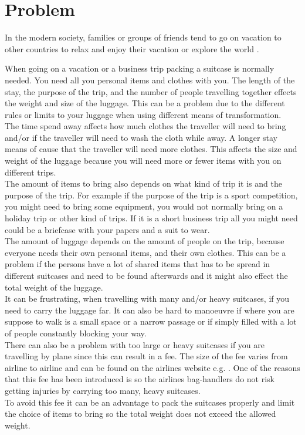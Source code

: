 \section{Problem}
In the modern society, families or groups of friends tend to go on vacation to other countries to relax and enjoy their vacation or explore the world \citep{danskecharter}.

When going on a vacation or a business trip packing a suitcase is normally needed. You need all you personal items and clothes with you. The length of the stay, the purpose of the trip, and the number of people travelling together effects the weight and size of the luggage. This can be a problem due to the different rules or limits to your luggage when using different means of transformation.\\

The time spend away affects how much clothes the traveller will need to bring and/or if the traveller will need to wash the cloth while away. A longer stay means of cause that the traveller will need more clothes. This affects the size and weight of the luggage because you will need more or fewer items with you on different trips.\\
 
The amount of items to bring also depends on what kind of trip it is and the purpose of the trip. For example if the purpose of the trip is a sport competition, you might need to bring some equipment, you would not normally bring on a holiday trip or other kind of trips. If it is a short business trip all you might need could be a briefcase with your papers and a suit to wear.\\

The amount of luggage depends on the amount of people on the trip, because everyone needs their own personal items, and their own clothes. This can be a problem if the persons have a lot of shared items that has to be spread in different suitcases and need to be found afterwards and it might also effect the total weight of the luggage.\\

It can be frustrating, when travelling with many and/or heavy suitcases, if you need to carry the luggage far. It can also be hard to manoeuvre if where you are suppose to walk is a small space or a narrow passage or if simply filled with a lot of people constantly blocking your way.\\
 
There can also be a problem with too large or heavy suitcases if you are travelling by plane since this can result in a fee. The size of the fee varies from airline to airline and can be found on the airlines website e.g.  \citep{altombag}. One of the reasons that this fee has been introduced is so the airlines bag-handlers do not risk getting injuries by carrying too many, heavy suitcases.\\ 
To avoid this fee it can be an advantage to pack the suitcases properly and limit the choice of items to bring so the total weight does not exceed the allowed weight.\\


